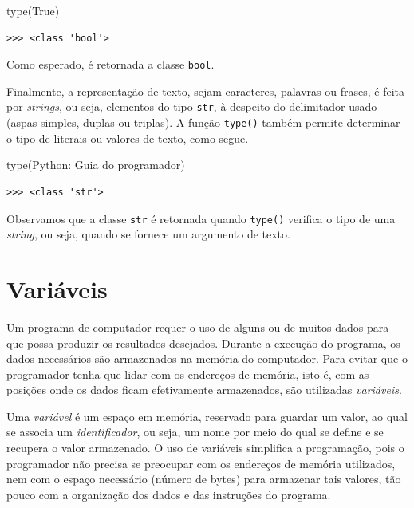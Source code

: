 \documentclass[
]{book}
\newenvironment{Shaded}{\begin{snugshade}}{\end{snugshade}}
\newcommand{\BuiltInTok}[1]{#1}
\newcommand{\NormalTok}[1]{#1}
\newcommand{\StringTok}[1]{\textcolor[rgb]{0.31,0.60,0.02}{#1}}
\newcommand{\VariableTok}[1]{\textcolor[rgb]{0.00,0.00,0.00}{#1}}
\begin{document}
\begin{Shaded}
\begin{Highlighting}[]
\BuiltInTok{type}\NormalTok{(}\VariableTok{True}\NormalTok{)}
\end{Highlighting}
\end{Shaded}

\begin{verbatim}
>>> <class 'bool'>
\end{verbatim}

Como esperado, é retornada a classe \texttt{bool}.

Finalmente, a representação de texto, sejam caracteres, palavras ou frases, é feita por \emph{strings}, ou seja, elementos do tipo \texttt{str}, à despeito do delimitador usado (aspas simples, duplas ou triplas). A função \texttt{type()} também permite determinar o tipo de literais ou valores de texto, como segue.

\begin{Shaded}
\begin{Highlighting}[]
\BuiltInTok{type}\NormalTok{(}\StringTok{\textquotesingle{}Python: Guia do programador\textquotesingle{}}\NormalTok{)}
\end{Highlighting}
\end{Shaded}

\begin{verbatim}
>>> <class 'str'>
\end{verbatim}

Observamos que a classe \texttt{str} é retornada quando \texttt{type()} verifica o tipo de uma \emph{string}, ou seja, quando se fornece um argumento de texto.

\hypertarget{comput-varia}{%
\section{Variáveis}\label{comput-varia}}

Um programa de computador requer o uso de alguns ou de muitos dados para que possa produzir os resultados desejados. Durante a execução do programa, os dados necessários são armazenados na memória do computador. Para evitar que o programador tenha que lidar com os endereços de memória, isto é, com as posições onde os dados ficam efetivamente armazenados, são utilizadas \emph{variáveis}.

Uma \emph{variável} é um espaço em memória, reservado para guardar um valor, ao qual se associa um \emph{identificador}, ou seja, um nome por meio do qual se define e se recupera o valor armazenado. O uso de variáveis simplifica a programação, pois o programador não precisa se preocupar com os endereços de memória utilizados, nem com o espaço necessário (número de bytes) para armazenar tais valores, tão pouco com a organização dos dados e das instruções do programa.
\end{document}
